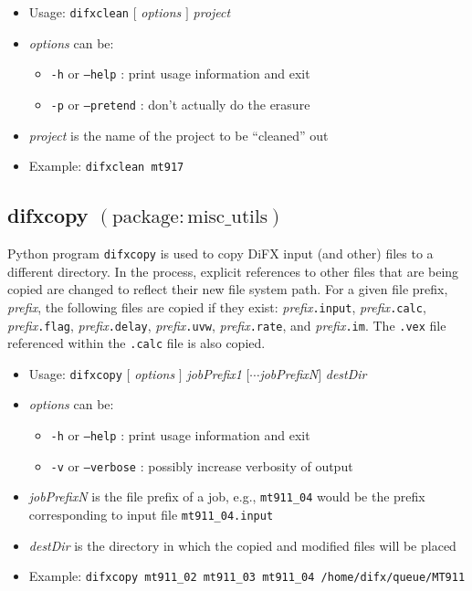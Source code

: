 \begin{itemize}
\item[] Usage: {\tt difxclean} $[$ {\em options} $]$ {\em project}
\item[] {\em options} can be:
\begin{itemize}
\item[] {\tt -h} or {\tt --help} : print usage information and exit
\item[] {\tt -p} or {\tt --pretend} : don't actually do the erasure
\end{itemize}
\item[] {\em project} is the name of the project to be ``cleaned'' out
\item[] Example: {\tt difxclean mt917}
\end{itemize}









\subsection{difxcopy {\small $\mathrm{(package: misc\_utils)}$}} \label{sec:difxcopy}

Python program {\tt difxcopy} is used to copy DiFX input (and other) files to a different directory.
In the process, explicit references to other files that are being copied are changed to reflect their
new file system path.
For a given file prefix, {\em prefix}, the following files are copied if they exist: {\em prefix}{\tt .input}, {\em prefix}{\tt .calc}, {\em prefix}{\tt .flag}, {\em prefix}{\tt .delay}, {\em prefix}{\tt .uvw}, {\em prefix}{\tt .rate}, and {\em prefix}{\tt .im}.
The {\tt .vex} file referenced within the {\tt .calc} file is also copied.

\begin{itemize}
\item[] Usage: {\tt difxcopy} $[$ {\em options} $]$ {\em jobPrefix1} $[\cdots${\em jobPrefixN}$]$ {\em destDir}
\item[] {\em options} can be:
\begin{itemize}
\item[] {\tt -h} or {\tt --help} : print usage information and exit
\item[] {\tt -v} or {\tt --verbose} : possibly increase verbosity of output
\end{itemize}
\item[] {\em jobPrefixN} is the file prefix of a job, e.g., {\tt mt911\_04} would be the prefix corresponding to input file {\tt mt911\_04.input}
\item[] {\em destDir} is the directory in which the copied and modified files will be placed
\item[] Example: {\tt difxcopy mt911\_02 mt911\_03 mt911\_04 /home/difx/queue/MT911}
\end{itemize}










